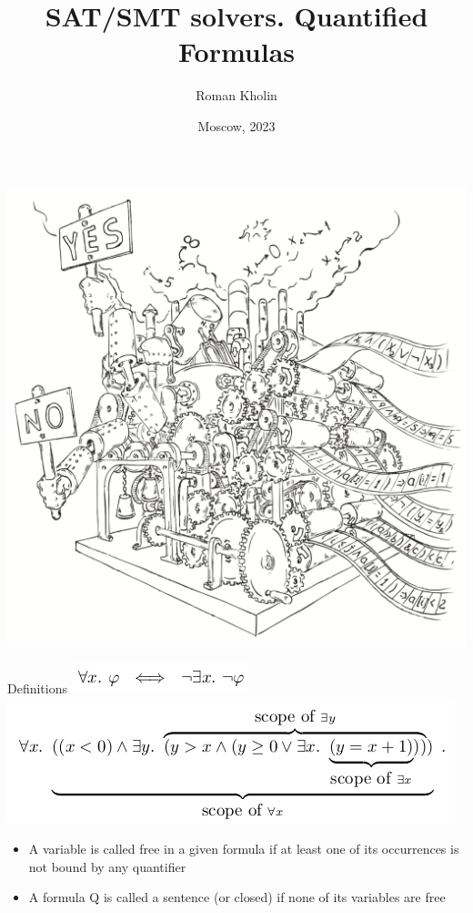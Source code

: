 \documentclass{beamer}
\begin{document}
\title{SAT/SMT solvers. Quantified Formulas}
\author{Roman Kholin}
\date{Moscow, 2023}

\begin{frame}
\includegraphics[scale=0.5]{../decision-procedure.png}
\end{frame}

\frame{\titlepage}

\begin{frame}{Definitions}
\includegraphics[scale=0.5]{all_and_exist.png}\newline
\includegraphics[scale=0.5]{scope.png}\newline
\begin{block}{}
\begin{itemize}
\item A variable is called free in a given formula if at least one of its occurrences is not bound by any quantifier
\item A formula Q is called a sentence (or closed) if none of its variables are free
\end{itemize}
\end{block}
\end{frame}
\end{document}
